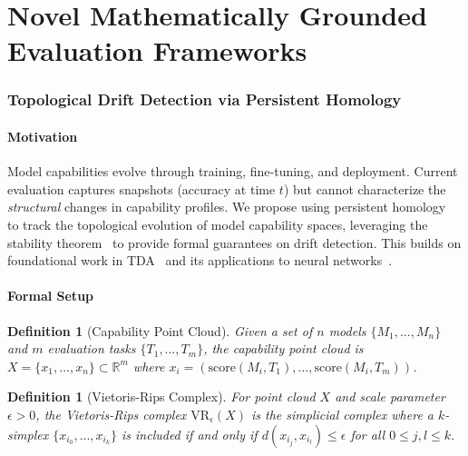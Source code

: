 \documentclass[11pt]{article}
\newtheorem{definition}[theorem]{Definition}
\newcommand{\R}{\mathbb{R}}
\newcommand{\Rips}{\mathrm{VR}}
\begin{document}
\part{Novel Mathematically Grounded Evaluation Frameworks}
\label{part:novel}

\section{Topological Drift Detection via Persistent Homology}
\label{sec:topological}

\subsection{Motivation}

Model capabilities evolve through training, fine-tuning, and deployment. Current evaluation captures snapshots (accuracy at time $t$) but cannot characterize the \emph{structural} changes in capability profiles. We propose using persistent homology~\cite{edelsbrunner2008persistent,ghrist2007barcodes} to track the topological evolution of model capability spaces, leveraging the stability theorem~\cite{cohen2007stability,chazal2014persistence} to provide formal guarantees on drift detection. This builds on foundational work in TDA~\cite{carlsson2009topology,chazal2021introduction} and its applications to neural networks~\cite{rieck2019neural,naitzat2020topology,carlsson2020topological}.

\subsection{Formal Setup}

\begin{definition}[Capability Point Cloud]
Given a set of $n$ models $\{M_1, \ldots, M_n\}$ and $m$ evaluation tasks $\{T_1, \ldots, T_m\}$, the \emph{capability point cloud} is $X = \{x_1, \ldots, x_n\} \subset \R^m$ where $x_i = (\text{score}(M_i, T_1), \ldots, \text{score}(M_i, T_m))$.
\end{definition}

\begin{definition}[Vietoris-Rips Complex]
For point cloud $X$ and scale parameter $\epsilon > 0$, the \emph{Vietoris-Rips complex} $\Rips_\epsilon(X)$ is the simplicial complex where a $k$-simplex $\{x_{i_0}, \ldots, x_{i_k}\}$ is included if and only if $d(x_{i_j}, x_{i_l}) \leq \epsilon$ for all $0 \leq j, l \leq k$.
\end{definition}
\end{document}
